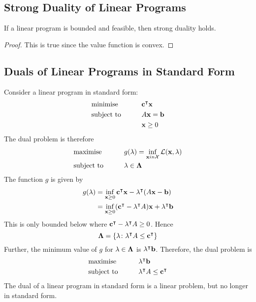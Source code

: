 \subsection{Strong Duality of Linear Programs}
\begin{theorem}
	If a linear program is bounded and feasible, then strong duality holds.
\end{theorem}
\begin{proof}
	This is true since the value function is convex.
\end{proof}

\subsection{Duals of Linear Programs in Standard Form}
Consider a linear program in standard form:
\begin{alignat*}{2}
	 & \text{minimise}   & \qquad & \vb c^\intercal \vb x \\
	 & \text{subject to} &        & A \vb x = \vb b        \\
	 &                   &        & \vb x \geq 0
\end{alignat*}
The dual problem is therefore
\begin{alignat*}{2}
	 & \text{maximise}   & \qquad & g(\vb \lambda) = \inf_{\vb x in \mathcal X} \mathcal L(\vb x, \vb \lambda) \\
	 & \text{subject to} &        & \vb \lambda \in \vb \Lambda                                                \\
\end{alignat*}
The function \( g \) is given by
\begin{align*}
	g(\vb \lambda) & = \inf_{\vb x \geq 0} \vb c^\intercal \vb x - \vb \lambda^\intercal (A \vb x - \vb b)                 \\
	               & = \inf_{\vb x \geq 0} (\vb c^\intercal - \vb \lambda^\intercal A)\vb x + \vb \lambda^\intercal \vb b
\end{align*}
This is only bounded below where \( \vb c^\intercal - \vb \lambda^\intercal A \geq 0 \).
Hence
\[
	\vb \Lambda = \qty{\vb \lambda \colon \vb \lambda^\intercal A \leq \vb c^\intercal}
\]
Further, the minimum value of \( g \) for \( \vb \lambda \in \vb \Lambda \) is \( \vb \lambda^\intercal \vb b \).
Therefore, the dual problem is
\begin{alignat*}{2}
	 & \text{maximise}   & \qquad & \vb \lambda^\intercal \vb b                   \\
	 & \text{subject to} &        & \vb \lambda^\intercal A \leq \vb c^\intercal \\
\end{alignat*}
The dual of a linear program in standard form is a linear problem, but no longer in standard form.

